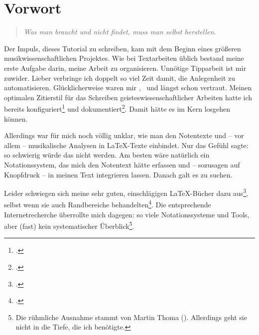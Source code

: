 %
%
%



\section{Vorwort}

\begin{quote}\textit{Was man braucht und nicht findet, muss man selbst herstellen.}
\end{quote}

Der Impuls, dieses Tutorial zu schreiben, kam mit dem Beginn eines größeren
musikwissenschaftlichen Projektes. Wie bei Textarbeiten üblich bestand meine
erste Aufgabe darin, meine Arbeit zu organisieren. Unnötige Tipparbeit ist mir
zuwider. Lieber verbringe ich doppelt so viel Zeit damit, die Anlegenheit zu
automatisieren. Glücklicherweise waren mir \acc{\LaTeX}, \ und
 längst schon vertraut. Meinen optimalen Zitierstil für das
Schreiben geisteswissenschaftlicher Arbeiten hatte ich bereits
konfiguriert\footcite[vgl.][\nopage wp]{Reincke2018a} und
dokumentiert\footcite[vgl][2ff]{Reincke2018b}. Damit hätte es im Kern losgehen
können.

Allerdings war für mich noch völlig unklar, wie man den Notentexte und -- vor
allem -- musikalische Analysen in \LaTeX-Texte einbindet. Nur das Gefühl sagte:
so schwierig würde das nicht werden. Am besten wäre natürlich ein
No\-ta\-tions\-system, das mich den Notentext hätte erfassen und -- sozusagen auf
Knopfdruck -- in meinen Text integrieren lassen. Danach galt es zu suchen.

Leider schwiegen sich meine sehr guten, einschlägigen \LaTeX-Bücher dazu
aus\footcite[ vgl.][vi ff, insbesondere 905 u. 909: das umfangreiche Register
erwähnt weder Musik im allgemeinen noch LilyPond oder MusiX\TeX im
Besonderen]{Voss2012a}, selbst wenn sie auch Randbereiche
behandelten\footcite[vgl.][vii ff, insbesondere 1080 u.
1087: auch dieses umfangreiche Register erwähnt weder Musik im allgemeinen noch
LilyPond oder MusiX\TeX im Besonderen.]{MitGoo2005a}. Die entsprechende
Internetrecherche überrollte mich dagegen: so viele Notationssysteme und Tools,
aber (fast) kein systematischer Überblick\footnote{Die rühmliche Ausnahme stammt
von Martin Thoma (\cite[vgl.][\nopage wp]{Thoma2018a}). Allerdings geht sie
nicht in die Tiefe, die ich benötigte.}.


